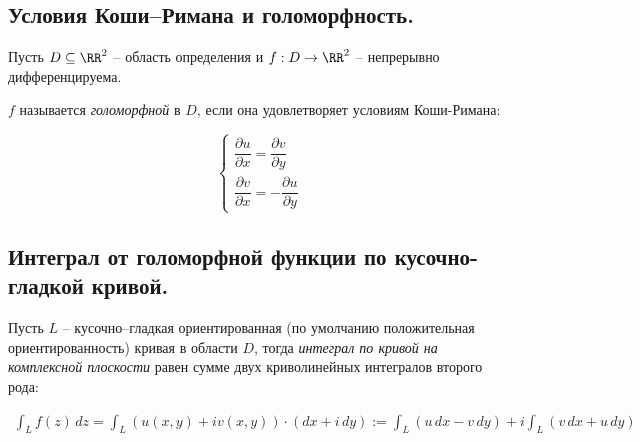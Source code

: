 \subsection*{Условия Коши--Римана и голоморфность.}

\begin{definition*}
	Пусть $D \subseteq \RR^2$ -- область определения и $f: D \to \RR^2$ -- непрерывно дифференцируема.
	
	$f$ называется \textit{голоморфной} в $D$, если она удовлетворяет условиям Коши-Римана:
	
	\begin{equation}
	\begin{cases}
	\dfrac{\partial u}{\partial x} = \dfrac{\partial v}{\partial y} \\
	\dfrac{\partial v}{\partial x} = -\dfrac{\partial u}{\partial y}
	\end{cases}
	\end{equation}
\end{definition*}

\subsection*{Интеграл от голоморфной функции по кусочно-гладкой кривой.}

\begin{definition*}
	Пусть $L$ -- кусочно--гладкая ориентированная (по умолчанию положительная ориентированность) кривая в области $D$, тогда \textit{интеграл по кривой на комплексной плоскости}  равен сумме двух криволинейных интегралов второго рода: 
	
	\begin{align*}
	\int_{L} f(z)\,dz = \int_{L} (u(x, y) + iv(x,y)) \cdot (dx + i\,dy) :=  \int_{L}  (u\,dx -v\,dy) + i  \int_{L} (v\,dx + u\,dy) 
	\end{align*}
\end{definition*}

